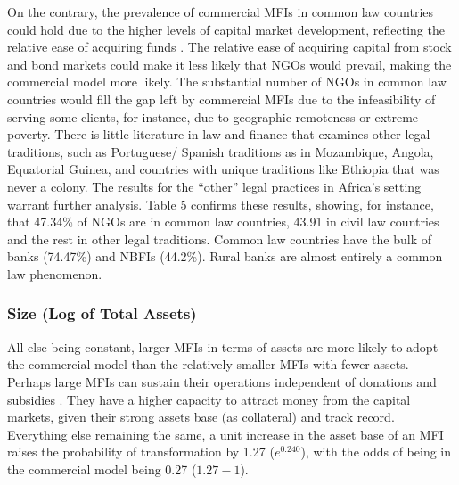 \documentclass[a4paper,nobind]{templates/ociamthesis}
\begin{document}
On the contrary, the prevalence of commercial MFIs in common law countries could hold due to the higher levels of capital market development, reflecting the relative ease of acquiring funds \autocite{schnyder2018twenty}. The relative ease of acquiring capital from stock and bond markets could make it less likely that NGOs would prevail, making the commercial model more likely. The substantial number of NGOs in common law countries would fill the gap left by commercial MFIs due to the infeasibility of serving some clients, for instance, due to geographic remoteness or extreme poverty. There is little literature in law and finance that examines other legal traditions, such as Portuguese/ Spanish traditions as in Mozambique, Angola, Equatorial Guinea, and countries with unique traditions like Ethiopia that was never a colony. The results for the ``other'' legal practices in Africa's setting warrant further analysis. Table 5 confirms these results, showing, for instance, that 47.34\% of NGOs are in common law countries, 43.91 in civil law countries and the rest in other legal traditions. Common law countries have the bulk of banks (74.47\%) and NBFIs (44.2\%). Rural banks are almost entirely a common law phenomenon.

\hypertarget{size-log-of-total-assets}{%
\subsubsection{Size (Log of Total Assets)}\label{size-log-of-total-assets}}

All else being constant, larger MFIs in terms of assets are more likely to adopt the commercial model than the relatively smaller MFIs with fewer assets. Perhaps large MFIs can sustain their operations independent of donations and subsidies \autocite{d2013unsubsidized}. They have a higher capacity to attract money from the capital markets, given their strong assets base (as collateral) and track record. Everything else remaining the same, a unit increase in the asset base of an MFI raises the probability of transformation by 1.27 (\(e^{0.240}\)), with the odds of being in the commercial model being 0.27 (\(1.27 - 1\)).
\end{document}
